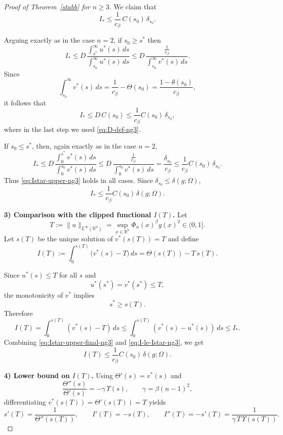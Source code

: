 \begin{proof}[Proof of Theorem~\ref{stabb} for $n\ge 3$]
We claim that
\begin{equation}\label{eq:Istar-upper-ng3}
I_*\le \frac1{c_\beta}\,C(s_0)\,\delta_{s_0}.
\end{equation}

Arguing exactly as in the case $n=2$, if $s_0\ge s^*$ then
\[
I_*
\le
D\,
\frac{\int_{s^*}^{\infty}u^*(s)\,ds}{\int_{s_0}^{\infty}u^*(s)\,ds}
\le
D\,
\frac{\frac1{c_\beta}}{\int_{s_0}^{\infty}v^*(s)\,ds}.
\]
Since
\[
\int_{s_0}^{\infty}v^*(s)\,ds
=
\frac1{c_\beta}-\Theta(s_0)
=
\frac{1-\theta(s_0)}{c_\beta},
\]
it follows that
\[
I_*
\le
D\,C(s_0)
\le
\frac1{c_\beta}C(s_0)\,\delta_{s_0},
\]
where in the last step we used \eqref{eq:D-def-ng3}.

If $s_0\le s^*$, then, again exactly as in the case $n=2$,
\[
I_*
\le
D\,
\frac{\int_0^{s^*}v^*(s)\,ds}{\int_0^{s_0}v^*(s)\,ds}
\le
D\,
\frac{\frac1{c_\beta}}{\int_0^{s_0}v^*(s)\,ds}
=
\frac{\delta_{s_0}}{c_\beta}
\le
\frac1{c_\beta}C(s_0)\,\delta_{s_0}.
\]
Thus \eqref{eq:Istar-upper-ng3} holds in all cases. Since $\delta_{s_0}\le\delta(g;\Omega)$,
\begin{equation}\label{eq:Istar-upper-final-ng3}
I_*\le \frac1{c_\beta}C(s_0)\,\delta(g;\Omega).
\end{equation}

\smallskip\noindent
\textbf{3) Comparison with the clipped functional $I(T)$.}
Let
\[
T:=\|u\|_{L^\infty(\mathbb B^n)}
=
\sup_{x\in\mathbb B^n}\Phi_n(x)^\beta g(x)^2\in(0,1].
\]
Let $s(T)$ be the unique solution of $v^*(s(T))=T$ and define
\[
I(T):=\int_0^{s(T)}\bigl(v^*(s)-T\bigr)\,ds
=
\Theta(s(T))-T\,s(T).
\]

Since $u^*(s)\le T$ for all $s$ and
\[
u^*(s^*)=v^*(s^*)\le T,
\]
the monotonicity of $v^*$ implies
\[
s^*\ge s(T).
\]
Therefore
\begin{equation}\label{eq:I-le-Istar-ng3}
I(T)
=
\int_0^{s(T)}(v^*(s)-T)\,ds
\le
\int_0^{s(T)}(v^*(s)-u^*(s))\,ds
\le
I_*.
\end{equation}
Combining \eqref{eq:Istar-upper-final-ng3} and \eqref{eq:I-le-Istar-ng3}, we get
\begin{equation}\label{eq:I-upper-deficit-ng3}
I(T)\le \frac1{c_\beta}C(s_0)\,\delta(g;\Omega).
\end{equation}

\smallskip\noindent
\textbf{4) Lower bound on $I(T)$.}
Using $\Theta'(s)=v^*(s)$ and
\[
\frac{\Theta''(s)}{\Theta'(s)}=-\gamma\,\Upsilon(s),
\qquad \gamma=\beta(n-1)^2,
\]
differentiating $v^*(s(T))=\Theta'(s(T))=T$ yields
\[
s'(T)=\frac{1}{\Theta''(s(T))},
\qquad
I'(T)=-s(T),
\qquad
I''(T)=-s'(T)=\frac{1}{\gamma\,T\,\Upsilon(s(T))}.
\]


\end{proof}
